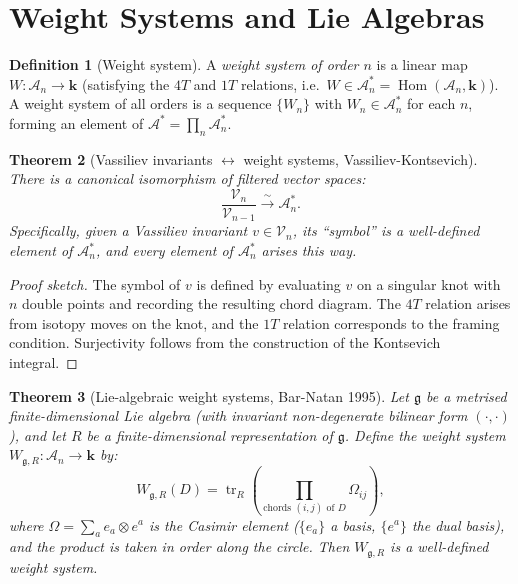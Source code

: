 \documentclass[12pt,a4paper]{amsart}
\newtheorem{theorem}{Theorem}[section]
\theoremstyle{definition}
\newtheorem{definition}[theorem]{Definition}
\newcommand{\Ac}{\mathcal{A}}
\DeclareMathOperator{\Hom}{Hom}
\DeclareMathOperator{\tr}{tr}
\begin{document}
\section{Weight Systems and Lie Algebras}\label{sec:weight}

\begin{definition}[Weight system]
A \emph{weight system of order $n$} is a linear map
$W: \Ac_n \to \mathbf{k}$ (satisfying the $4T$ and $1T$ relations, i.e.\
$W \in \Ac_n^* = \Hom(\Ac_n, \mathbf{k})$).  A weight system of all orders
is a sequence $\{W_n\}$ with $W_n \in \Ac_n^*$ for each $n$, forming an
element of $\Ac^* = \prod_n \Ac_n^*$.
\end{definition}

\begin{theorem}[Vassiliev invariants $\leftrightarrow$ weight systems,
Vassiliev-Kontsevich]\label{thm:vs_ws}
There is a canonical isomorphism of filtered vector spaces:
\[
  \frac{\mathcal{V}_n}{\mathcal{V}_{n-1}} \xrightarrow{\;\sim\;} \Ac_n^*.
\]
Specifically, given a Vassiliev invariant $v \in \mathcal{V}_n$, its
``symbol'' is a well-defined element of $\Ac_n^*$, and every element of
$\Ac_n^*$ arises this way.
\end{theorem}

\begin{proof}[Proof sketch]
The symbol of $v$ is defined by evaluating $v$ on a singular knot with
$n$ double points and recording the resulting chord diagram.  The $4T$
relation arises from isotopy moves on the knot, and the $1T$ relation
corresponds to the framing condition.  Surjectivity follows from the
construction of the Kontsevich integral.
\end{proof}

\begin{theorem}[Lie-algebraic weight systems, Bar-Natan 1995]
\label{thm:lie_ws}
Let $\mathfrak{g}$ be a metrised finite-dimensional Lie algebra (with
invariant non-degenerate bilinear form $(\cdot,\cdot)$), and let $R$ be
a finite-dimensional representation of $\mathfrak{g}$.  Define the
weight system $W_{\mathfrak{g},R}: \Ac_n \to \mathbf{k}$ by:
\[
  W_{\mathfrak{g},R}(D) = \tr_R\!\left(\prod_{\text{chords } (i,j) \text{ of } D}
  \Omega_{ij}\right),
\]
where $\Omega = \sum_a e_a \otimes e^a$ is the Casimir element ($\{e_a\}$
a basis, $\{e^a\}$ the dual basis), and the product is taken in order along
the circle.  Then $W_{\mathfrak{g},R}$ is a well-defined weight system.
\end{theorem}
\end{document}
